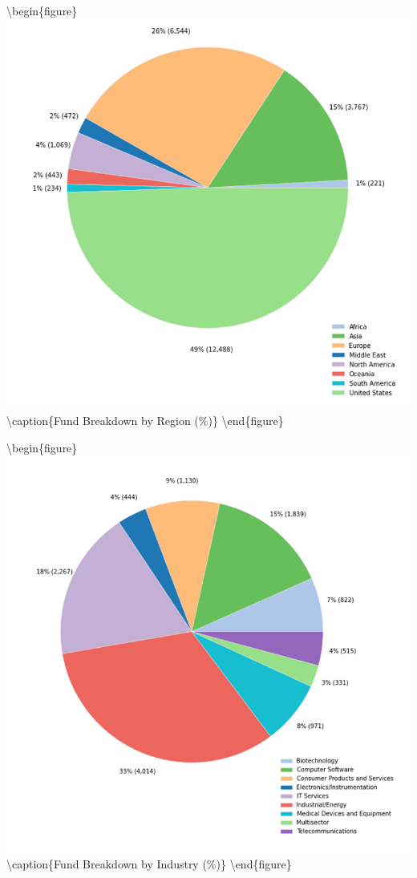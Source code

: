 \documentclass[
]{book}
\begin{document}
\textbackslash begin\{figure\}
\includegraphics[width=1\linewidth]{./assets/pcri/pcrifigurea2web} \textbackslash caption\{Fund Breakdown by Region (\%)\}\label{fig:pcrifigurea2}
\textbackslash end\{figure\}

\textbackslash begin\{figure\}
\includegraphics[width=1\linewidth]{./assets/pcri/pcrifigurea3web} \textbackslash caption\{Fund Breakdown by Industry (\%)\}\label{fig:pcrifigurea3}
\textbackslash end\{figure\}
\end{document}
